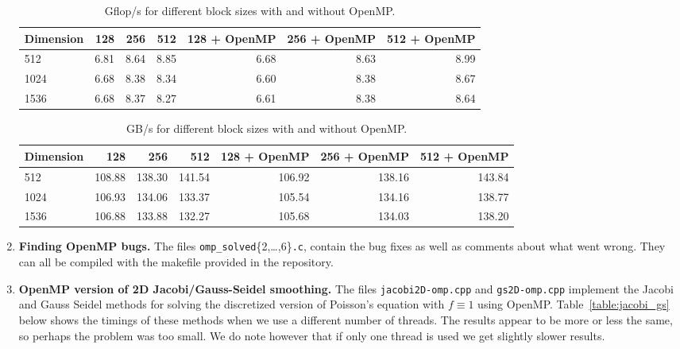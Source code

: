 \documentclass[12pt]{article}
\begin{document}
\begin{enumerate}
\begin{table}[H]
\centering
\begin{tabular}{| l | r | r | r | r | r | r |}
\hline
Dimension & 128 & 256 & 512 & 128 + OpenMP & 256 + OpenMP & 512 + OpenMP\\
\hline
512 & 6.81 & 8.64 &  8.85 & 6.68 & 8.63 & 8.99 \\
1024 & 6.68 & 8.38& 8.34 & 6.60& 8.38 & 8.67 \\
1536 & 6.68 & 8.37 & 8.27 & 6.61& 8.38 & 8.64 \\
\hline
\end{tabular}
\caption{Gflop/s for different block sizes with and without OpenMP.}
\label{table:block_gflops}
\end{table}


\begin{table}[H]
\centering
\begin{tabular}{| l | r | r | r | r | r | r |}
\hline
Dimension & 128 & 256 & 512 & 128 + OpenMP & 256 + OpenMP & 512 + OpenMP\\
\hline
512 & 108.88 & 138.30 &  141.54 & 106.92 & 138.16 & 143.84\\
1024 & 106.93 & 134.06 & 133.37 & 105.54 & 134.16 & 138.77\\
1536 & 106.88 & 133.88 & 132.27& 105.68 & 134.03 & 138.20 \\
\hline
\end{tabular}
\caption{GB/s for different block sizes with and without OpenMP.}
\label{table:block_gbs}
\end{table}




\item {\bf Finding OpenMP bugs.}  The files \texttt{omp\_solved}\{2,\ldots,6\}\texttt{.c}, contain the bug fixes as well as comments
about what went wrong.  They can all be compiled with the makefile provided in the repository.





\item {\bf OpenMP version of 2D Jacobi/Gauss-Seidel smoothing.}
 The files \texttt{jacobi2D-omp.cpp} and \texttt{gs2D-omp.cpp} implement the Jacobi and Gauss Seidel methods for solving the discretized version of Poisson's equation with $f\equiv 1$ using OpenMP.  Table~\ref{table:jacobi_gs} below shows the timings of these methods when we use a different number of threads.  The results appear to be more or less the same, so perhaps the problem was too small.  We do note however that if only one thread is used we get slightly slower results.


\end{enumerate}
\end{document}

